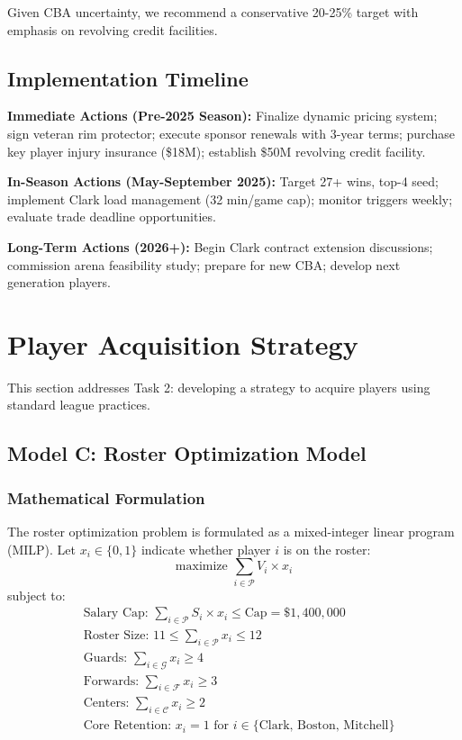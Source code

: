 \documentclass{mcmthesis}
\begin{document}
Given CBA uncertainty, we recommend a conservative 20-25\% target with emphasis on revolving credit facilities.

\subsection{Implementation Timeline}

\textbf{Immediate Actions (Pre-2025 Season):} Finalize dynamic pricing system; sign veteran rim protector; execute sponsor renewals with 3-year terms; purchase key player injury insurance (\$18M); establish \$50M revolving credit facility.

\textbf{In-Season Actions (May-September 2025):} Target 27+ wins, top-4 seed; implement Clark load management (32 min/game cap); monitor triggers weekly; evaluate trade deadline opportunities.

\textbf{Long-Term Actions (2026+):} Begin Clark contract extension discussions; commission arena feasibility study; prepare for new CBA; develop next generation players.

\section{Player Acquisition Strategy}

This section addresses Task 2: developing a strategy to acquire players using standard league practices.

\subsection{Model C: Roster Optimization Model}

\subsubsection{Mathematical Formulation}

The roster optimization problem is formulated as a mixed-integer linear program (MILP). Let $x_i \in \{0,1\}$ indicate whether player $i$ is on the roster:
\begin{equation}
\text{maximize } \sum_{i \in \mathcal{P}} V_i \times x_i
\end{equation}
subject to:
\begin{align}
&\text{Salary Cap: } \sum_{i \in \mathcal{P}} S_i \times x_i \leq \text{Cap} = \$1,400,000 \\
&\text{Roster Size: } 11 \leq \sum_{i \in \mathcal{P}} x_i \leq 12 \\
&\text{Guards: } \sum_{i \in \mathcal{G}} x_i \geq 4 \\
&\text{Forwards: } \sum_{i \in \mathcal{F}} x_i \geq 3 \\
&\text{Centers: } \sum_{i \in \mathcal{C}} x_i \geq 2 \\
&\text{Core Retention: } x_i = 1 \text{ for } i \in \{\text{Clark, Boston, Mitchell}\}
\end{align}
\end{document}
